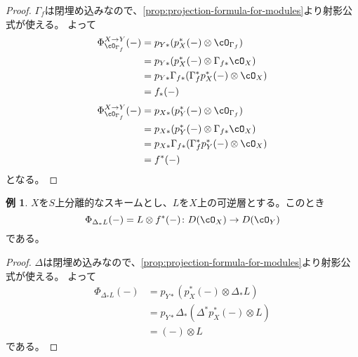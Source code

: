 \documentclass[uplatex, a4paper, dvipdfmx]{jsarticle}
\theoremstyle{definition}
\newtheorem{example}[theorem]{例}
\begin{document}
\begin{proof}
    $\Gamma_f$は閉埋め込みなので、\ref{prop:projection-formula-for-modules}より射影公式が使える。
    よって
    \begin{align}
        \Phi_{\cO_{\Gamma_f}}^{X \to Y}(-) & = p_{Y*}(p_X^*(-) \otimes \cO_{\Gamma_f})               \\
                                           & = p_{Y*}(p_X^*(-) \otimes \Gamma_{f*}\cO_X)             \\
                                           & = p_{Y*}\Gamma_{f*}(\Gamma_{f}^*p_X^*(-) \otimes \cO_X) \\
                                           & = f_*(-)
    \end{align}
    \begin{align}
        \Phi_{\cO_{\Gamma_f}}^{X \to Y}(-) & = p_{X*}(p_Y^*(-) \otimes \cO_{\Gamma_f})               \\
                                           & = p_{X*}(p_Y^*(-) \otimes \Gamma_{f*}\cO_X)             \\
                                           & = p_{X*}\Gamma_{f*}(\Gamma_{f}^*p_Y^*(-) \otimes \cO_X) \\
                                           & = f^*(-)
    \end{align}
    となる。
\end{proof}
\begin{example}\label{ex:line-bundle-as-Fourier-Mukai}
    $X$を$S$上分離的なスキームとし、$L$を$X$上の可逆層とする。このとき
    \begin{equation}
        \Phi_{\Delta_*L}(-) = L \otimes f^*(-) \colon D(\cO_X) \to D(\cO_Y)
    \end{equation}
    である。
\end{example}
\begin{proof}
    $\Delta$は閉埋め込みなので、\ref{prop:projection-formula-for-modules}より射影公式が使える。
    よって
    \begin{align}
        \Phi_{\Delta_*L}(-) & = p_{Y*}(p_X^*(-) \otimes \Delta_* L)        \\
                            & = p_{Y*}\Delta_*(\Delta^*p_X^*(-) \otimes L) \\
                            & = (-) \otimes L
    \end{align}
    である。
\end{proof}
\end{document}
